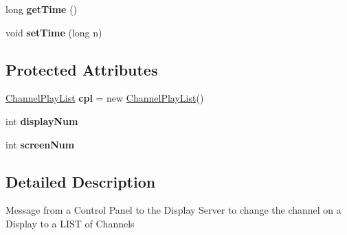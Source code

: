 \begin{DoxyCompactItemize}
\item 
\hypertarget{classgov_1_1fnal_1_1ppd_1_1dd_1_1chat_1_1xml_1_1ChangeChannelList_ad9dd0598b5f26318ea5f869ae29edad4}{long {\bfseries get\-Time} ()}\label{classgov_1_1fnal_1_1ppd_1_1dd_1_1chat_1_1xml_1_1ChangeChannelList_ad9dd0598b5f26318ea5f869ae29edad4}

\item 
\hypertarget{classgov_1_1fnal_1_1ppd_1_1dd_1_1chat_1_1xml_1_1ChangeChannelList_afc0554243ff2d2273ef24d9c52b94b77}{void {\bfseries set\-Time} (long n)}\label{classgov_1_1fnal_1_1ppd_1_1dd_1_1chat_1_1xml_1_1ChangeChannelList_afc0554243ff2d2273ef24d9c52b94b77}

\end{DoxyCompactItemize}
\subsection*{Protected Attributes}
\begin{DoxyCompactItemize}
\item 
\hypertarget{classgov_1_1fnal_1_1ppd_1_1dd_1_1chat_1_1xml_1_1ChangeChannelList_a388c5a5adc2c06167cb2cd1b2266bc8f}{\hyperlink{classgov_1_1fnal_1_1ppd_1_1dd_1_1channel_1_1ChannelPlayList}{Channel\-Play\-List} {\bfseries cpl} = new \hyperlink{classgov_1_1fnal_1_1ppd_1_1dd_1_1channel_1_1ChannelPlayList}{Channel\-Play\-List}()}\label{classgov_1_1fnal_1_1ppd_1_1dd_1_1chat_1_1xml_1_1ChangeChannelList_a388c5a5adc2c06167cb2cd1b2266bc8f}

\item 
\hypertarget{classgov_1_1fnal_1_1ppd_1_1dd_1_1chat_1_1xml_1_1ChangeChannelList_aedeeeb53984ea67399328fd67048efe5}{int {\bfseries display\-Num}}\label{classgov_1_1fnal_1_1ppd_1_1dd_1_1chat_1_1xml_1_1ChangeChannelList_aedeeeb53984ea67399328fd67048efe5}

\item 
\hypertarget{classgov_1_1fnal_1_1ppd_1_1dd_1_1chat_1_1xml_1_1ChangeChannelList_afe1bc34b59d494cadbb48b16eefdec82}{int {\bfseries screen\-Num}}\label{classgov_1_1fnal_1_1ppd_1_1dd_1_1chat_1_1xml_1_1ChangeChannelList_afe1bc34b59d494cadbb48b16eefdec82}

\end{DoxyCompactItemize}


\subsection{Detailed Description}
Message from a Control Panel to the Display Server to change the channel on a Display to a L\-I\-S\-T of Channels

